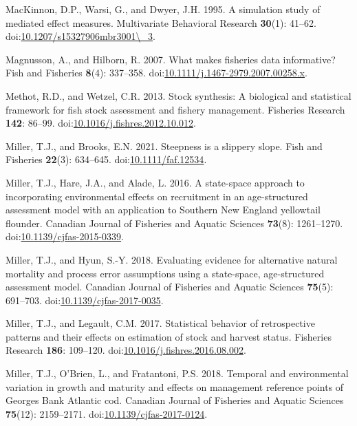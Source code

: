 \documentclass[
  12pt,
]{article}
\newlength{\cslhangindent}
\newenvironment{CSLReferences}[2] %
 {\begin{list}{}{%
  \setlength{\itemindent}{0pt}
  \setlength{\leftmargin}{0pt}
  \setlength{\parsep}{0pt}
  \ifodd #1
   \setlength{\leftmargin}{\cslhangindent}
   \setlength{\itemindent}{-1\cslhangindent}
  \fi
  \setlength{\itemsep}{#2\baselineskip}}}
 {\end{list}}
\begin{document}
\begin{CSLReferences}{1}{0}
MacKinnon, D.P., Warsi, G., and Dwyer, J.H. 1995. A simulation study of
mediated effect measures. Multivariate Behavioral Research
\textbf{30}(1): 41--62.
doi:\href{https://doi.org/10.1207/s15327906mbr3001/_3}{10.1207/s15327906mbr3001\textbackslash\_3}.

Magnusson, A., and Hilborn, R. 2007. What makes fisheries data
informative? Fish and Fisheries \textbf{8}(4): 337--358.
doi:\href{https://doi.org/10.1111/j.1467-2979.2007.00258.x}{10.1111/j.1467-2979.2007.00258.x}.

Methot, R.D., and Wetzel, C.R. 2013. Stock synthesis: A biological and
statistical framework for fish stock assessment and fishery management.
Fisheries Research \textbf{142}: 86--99.
doi:\href{https://doi.org/10.1016/j.fishres.2012.10.012}{10.1016/j.fishres.2012.10.012}.

Miller, T.J., and Brooks, E.N. 2021. Steepness is a slippery slope. Fish
and Fisheries \textbf{22}(3): 634--645.
doi:\href{https://doi.org/10.1111/faf.12534}{10.1111/faf.12534}.

Miller, T.J., Hare, J.A., and Alade, L. 2016. A state-space approach to
incorporating environmental effects on recruitment in an age-structured
assessment model with an application to {S}outhern {N}ew {E}ngland
yellowtail flounder. Canadian Journal of Fisheries and Aquatic Sciences
\textbf{73}(8): 1261--1270.
doi:\href{https://doi.org/10.1139/cjfas-2015-0339}{10.1139/cjfas-2015-0339}.

Miller, T.J., and Hyun, S.-Y. 2018. Evaluating evidence for alternative
natural mortality and process error assumptions using a state-space,
age-structured assessment model. Canadian Journal of Fisheries and
Aquatic Sciences \textbf{75}(5): 691--703.
doi:\href{https://doi.org/10.1139/cjfas-2017-0035}{10.1139/cjfas-2017-0035}.

Miller, T.J., and Legault, C.M. 2017. Statistical behavior of
retrospective patterns and their effects on estimation of stock and
harvest status. Fisheries Research \textbf{186}: 109--120.
doi:\href{https://doi.org/10.1016/j.fishres.2016.08.002}{10.1016/j.fishres.2016.08.002}.

Miller, T.J., O'Brien, L., and Fratantoni, P.S. 2018. Temporal and
environmental variation in growth and maturity and effects on management
reference points of {G}eorges {B}ank {A}tlantic cod. Canadian Journal of
Fisheries and Aquatic Sciences \textbf{75}(12): 2159--2171.
doi:\href{https://doi.org/10.1139/cjfas-2017-0124}{10.1139/cjfas-2017-0124}.


\end{CSLReferences}
\end{document}

